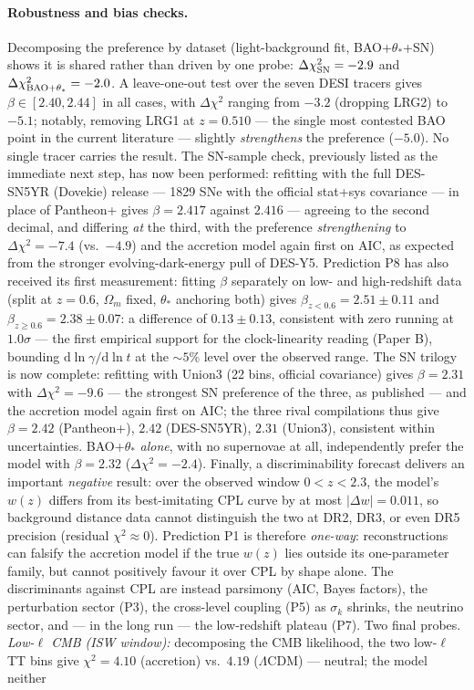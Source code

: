 \documentclass[11pt]{article}
\begin{document}
\paragraph{Robustness and bias checks.} Decomposing the preference by dataset (light-background fit, BAO+$\theta_*$+SN) shows it is shared rather than driven by one probe: $\Delta\chi^2_{\rm SN} = -2.9$ and $\Delta\chi^2_{\rm BAO+\theta_*} = -2.0$. A leave-one-out test over the seven DESI tracers gives $\beta \in [2.40, 2.44]$ in all cases, with $\Delta\chi^2$ ranging from $-3.2$ (dropping LRG2) to $-5.1$; notably, removing LRG1 at $z=0.510$ --- the single most contested BAO point in the current literature --- slightly \emph{strengthens} the preference ($-5.0$). No single tracer carries the result. The SN-sample check, previously listed as the immediate next step, has now been performed: refitting with the full DES-SN5YR (Dovekie) release --- 1829 SNe with the official stat+sys covariance --- in place of Pantheon+ gives $\beta = 2.417$ against $2.416$ --- agreeing to the second decimal, and differing \emph{at} the third, with the preference \emph{strengthening} to $\Delta\chi^2 = -7.4$ (vs.\ $-4.9$) and the accretion model again first on AIC, as expected from the stronger evolving-dark-energy pull of DES-Y5. Prediction P8 has also received its first measurement: fitting $\beta$ separately on low- and high-redshift data (split at $z = 0.6$, $\Omega_m$ fixed, $\theta_*$ anchoring both) gives $\beta_{z<0.6} = 2.51 \pm 0.11$ and $\beta_{z\geq0.6} = 2.38 \pm 0.07$: a difference of $0.13 \pm 0.13$, consistent with zero running at $1.0\sigma$ --- the first empirical support for the clock-linearity reading (Paper B), bounding $\mathrm{d}\ln\gamma/\mathrm{d}\ln t$ at the $\sim5\%$ level over the observed range. The SN trilogy is now complete: refitting with Union3 (22 bins, official covariance) gives $\beta = 2.31$ with $\Delta\chi^2 = -9.6$ --- the strongest SN preference of the three, as published --- and the accretion model again first on AIC; the three rival compilations thus give $\beta = 2.42$ (Pantheon+), $2.42$ (DES-SN5YR), $2.31$ (Union3), consistent within uncertainties. BAO+$\theta_*$ \emph{alone}, with no supernovae at all, independently prefer the model with $\beta = 2.32$ ($\Delta\chi^2 = -2.4$). Finally, a discriminability forecast delivers an important \emph{negative} result: over the observed window $0 < z < 2.3$, the model's $w(z)$ differs from its best-imitating CPL curve by at most $|\Delta w| = 0.011$, so background distance data cannot distinguish the two at DR2, DR3, or even DR5 precision (residual $\chi^2 \approx 0$). Prediction P1 is therefore \emph{one-way}: reconstructions can falsify the accretion model if the true $w(z)$ lies outside its one-parameter family, but cannot positively favour it over CPL by shape alone. The discriminants against CPL are instead parsimony (AIC, Bayes factors), the perturbation sector (P3), the cross-level coupling (P5) as $\sigma_k$ shrinks, the neutrino sector, and --- in the long run --- the low-redshift plateau (P7). Two final probes. \emph{Low-$\ell$ CMB (ISW window):} decomposing the CMB likelihood, the two low-$\ell$ TT bins give $\chi^2 = 4.10$ (accretion) vs.\ $4.19$ ($\Lambda$CDM) --- neutral; the model neither 
\end{document}
